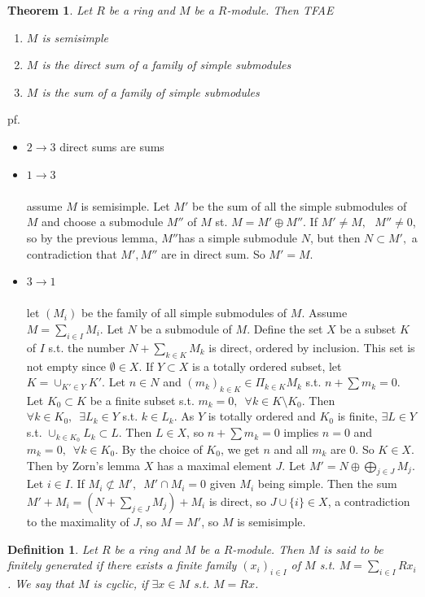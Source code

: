 \documentclass[12pt,letterpaper]{report}
\newtheorem{definition}{Definition}[section]
\newtheorem{theorem}{Theorem}[section]
\begin{document}
\begin{theorem}Let $R$ be a ring and $M$ be a $R$-module. Then TFAE\begin{enumerate}\item $M$ is semisimple\item $M$ is the direct sum of a family of simple submodules\item $M$ is the sum of a family of simple submodules\end{enumerate}\end{theorem}
pf.\begin{itemize}\item $2\rightarrow 3 $ direct sums are sums
\item$1\rightarrow 3$
\\\\assume $M$ is semisimple. Let $M'$ be the sum of all the simple submodules of $M$ and choose a submodule $M''$ of $M$ st. $M=M'\oplus M''$. If $M'\neq M,\,\,\,\,M''\neq0$, so by the previous lemma, $M''$has a simple submodule $N$, but then $N\subset M',$ a contradiction that $M',M''$ are in direct sum. So $M'=M$.
\item $3\rightarrow1$
\\\\let $(M_{i})$ be the family of all simple submodules of $M$. Assume $M=\sum_{i\in I}M_{i}$. Let $N$ be a submodule of $M$. Define the set $X$ be a subset $K$ of $I$ s.t. the number $N+\sum_{k\in K}M_{k}$ is direct, ordered by inclusion. This set is not empty since $\emptyset\in X$. If $Y\subset X$ is a totally ordered subset, let $K=\cup_{K'\in Y}K'$. Let $n\in N$ and $(m_{k})_{k\in K}\in \Pi_{k\in K}M_{k}$ s.t. $n+\sum m_{k}=0$. Let $K_{0}\subset K$ be a finite subset s.t. $m_{k}=0,\,\,\,\forall k\in K\setminus K_{0}$. Then $\forall k\in K_{0},\,\,\,\exists L_{k}\in Y$ s.t. $k\in L_{k}$. As $Y$ is totally ordered and $K_{0}$ is finite, $\exists L\in Y$ s.t. $\cup_{k\in K_{0}}L_{k}\subset L$. Then $L\in X$, so $n+\sum m_{k}=0$ implies $n=0$ and $m_{k}=0,\,\,\,\forall k\in K_{0}$. By the choice of $K_{0}$, we get $n$ and all $m_{k}$ are 0. So $K\in X$. Then by Zorn's lemma $X$ has a maximal element $J$. Let $M'=N\oplus \bigoplus_{j\in J}M_{j}$. Let $i\in I$. If $M_{i}\not\subset M',\,\,\,M'\cap M_{i}=0$ given $M_{i}$ being simple. Then the sum $M'+M_{i}=(N+\sum_{j\in J}M_{j})+M_{i}$ is direct, so $J\cup\{i\}\in X$, a contradiction to the maximality of $J$, so $M=M'$, so $M$ is semisimple. 
\end{itemize}
\begin{definition}Let $R$ be a ring and $M$ be a $R$-module. Then $M$ is said to be finitely generated if there exists a finite family $(x_{i})_{i\in I}$ of $M$ s.t. $M=\sum_{i\in I}Rx_{i}$. We say that $M$ is cyclic, if $\exists x\in M$ s.t. $M=Rx$.\end{definition}
\end{document}
